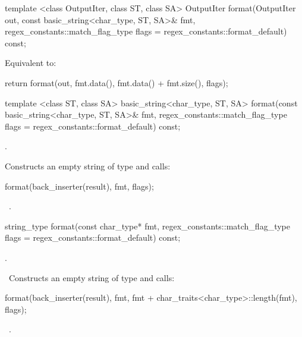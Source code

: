 %
%
\begin{itemdecl}
template <class OutputIter, class ST, class SA>
  OutputIter format(OutputIter out,
                    const basic_string<char_type, ST, SA>& fmt,
                    regex_constants::match_flag_type flags =
                      regex_constants::format_default) const;
\end{itemdecl}

\begin{itemdescr}
\pnum
\effects Equivalent to:
\begin{codeblock}
return format(out, fmt.data(), fmt.data() + fmt.size(), flags);
\end{codeblock}
\end{itemdescr}

%
%
\begin{itemdecl}
template <class ST, class SA>
  basic_string<char_type, ST, SA>
  format(const basic_string<char_type, ST, SA>& fmt,
         regex_constants::match_flag_type flags =
           regex_constants::format_default) const;
\end{itemdecl}

\begin{itemdescr}
\pnum
\requires {}.

\pnum
\effects
Constructs an empty string  of type  and
calls:
\begin{codeblock}
format(back_inserter(result), fmt, flags);
\end{codeblock}

\pnum
\returns\ .
\end{itemdescr}

%
%
\begin{itemdecl}
string_type
  format(const char_type* fmt,
         regex_constants::match_flag_type flags =
           regex_constants::format_default) const;
\end{itemdecl}

\begin{itemdescr}
\pnum
\requires {}.

\pnum
\effects\ Constructs an empty string  of type  and
calls:
\begin{codeblock}
format(back_inserter(result),
       fmt, fmt + char_traits<char_type>::length(fmt), flags);
\end{codeblock}

\pnum
\returns\ .
\end{itemdescr}

